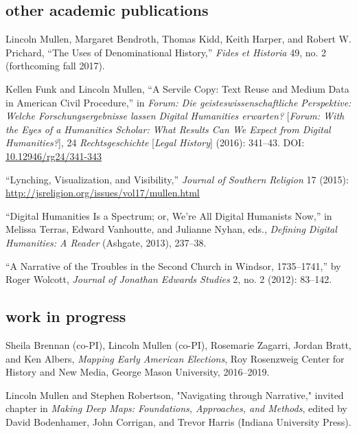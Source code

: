 \documentclass[11pt]{article}
\begin{document}

\subsection{other academic publications}\label{other-academic}

Lincoln Mullen, Margaret Bendroth, Thomas Kidd, Keith Harper, and Robert W. 
Prichard, ``The Uses of Denominational History,'' \emph{Fides et Historia} 49, 
no. 2 (forthcoming fall 2017).

Kellen Funk and Lincoln Mullen, ``A Servile Copy: Text Reuse and Medium Data 
in American Civil Procedure,'' in \emph{Forum: Die geisteswissenschaftliche 
  Perspektive: Welche Forschungsergebnisse lassen Digital Humanities 
  erwarten?} [\emph{Forum: With the Eyes of a Humanities Scholar: What Results 
  Can We Expect from Digital Humanities?}], 24 \emph{Rechtsgeschichte} 
[\emph{Legal History}] (2016): 341--43. DOI: 
\href{http://dx.doi.org/10.12946/rg24/341-343}{10.12946/rg24/341-343}

``Lynching, Visualization, and Visibility,'' \emph{Journal of Southern 
  Religion} 17 (2015): \url{http://jsreligion.org/issues/vol17/mullen.html}

``Digital Humanities Is a Spectrum; or, We're All Digital Humanists
Now,'' in Melissa Terras, Edward Vanhoutte, and Julianne Nyhan, eds.,
\emph{Defining Digital Humanities: A Reader} (Ashgate, 2013), 237--38.

``A Narrative of the Troubles in the Second Church in Windsor,
1735--1741,'' by Roger Wolcott, \emph{Journal of Jonathan Edwards
  Studies} 2, no. 2 (2012): 83--142.

\subsection{work in progress}\label{in-progress}

Sheila Brennan (co-PI), Lincoln Mullen (co-PI), Rosemarie Zagarri, Jordan Bratt, 
and Ken Albers, \emph{Mapping Early American Elections}, Roy Rosenzweig Center 
for History and New Media, George Mason University, 2016--2019.

Lincoln Mullen and Stephen Robertson, "Navigating through Narrative," invited 
chapter in \emph{Making Deep Maps: Foundations, Approaches, and Methods}, 
edited by David Bodenhamer, John Corrigan, and Trevor Harris (Indiana 
University Press).
\end{document}
